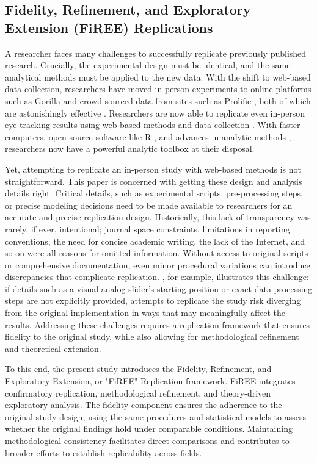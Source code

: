 \subsection{Fidelity, Refinement, and Exploratory Extension (FiREE) Replications}

A researcher faces many challenges to successfully replicate previously published research. Crucially, the experimental design must be identical, and the same analytical methods must be applied to the new data. With the shift to web-based data collection, researchers have moved in-person experiments to online platforms such as Gorilla \citep{Anwyl-Irvine_2019} and crowd-sourced data from sites such as Prolific \citep{douglas2023data}, both of which are astonishingly effective \citep{tomczak2023over, eerola2021online}. Researchers are now able to replicate even in-person eye-tracking results using web-based methods and data collection \citep[see ][] {semmelmann2018online, Vos_2022, Prystauka_Altmann_Rothman_2023}. With faster computers, open source software like R \citep{mizumoto_r_2015, Wickham2017R}, and advances in analytic methods \citep{gries2017ten}, researchers now have a powerful analytic toolbox at their disposal. 

Yet, attempting to replicate an in-person study with web-based methods is not straightforward. This paper is concerned with getting these design and analysis details right. Critical details, such as experimental scripts, pre-processing steps, or precise modeling decisions need to be made available to researchers for an accurate and precise replication design. Historically, this lack of transparency was rarely, if ever, intentional; journal space constraints, limitations in reporting conventions, the need for concise academic writing, the lack of the Internet, and so on were all reasons for omitted information. Without access to original scripts or comprehensive documentation, even minor procedural variations can introduce discrepancies that complicate replication. \cite{AOW}, for example, illustrates this challenge: if details such as a visual analog slider's starting position or exact data processing steps are not explicitly provided, attempts to replicate the study risk diverging from the original implementation in ways that may meaningfully affect the results. Addressing these challenges requires a replication framework that ensures fidelity to the original study, while also allowing for methodological refinement and theoretical extension.

To this end, the present study introduces the Fidelity, Refinement, and Exploratory Extension, or "FiREE" Replication framework. FiREE integrates confirmatory replication, methodological refinement, and theory-driven exploratory analysis. The fidelity component ensures the adherence to the original study design, using the same procedures and statistical models to assess whether the original findings hold under comparable conditions. Maintaining methodological consistency facilitates direct comparisons and contributes to broader efforts to establish replicability across fields. 

